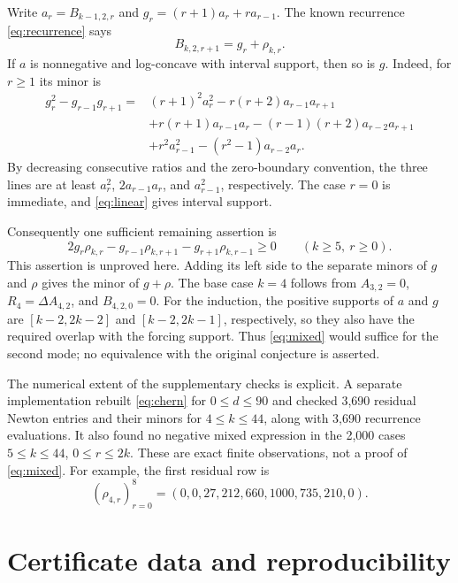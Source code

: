 \documentclass[11pt]{article}
\begin{document}
Write $a_r=B_{k-1,2,r}$ and $g_r=(r+1)a_r+r a_{r-1}$. The known
recurrence \eqref{eq:recurrence} says
\begin{equation}\label{eq:induction}
B_{k,2,r+1}=g_r+\rho_{k,r}.
\end{equation}
If $a$ is nonnegative and log-concave with interval support, then so is
$g$. Indeed, for $r\geq1$ its minor is
\begin{align*}
g_r^2-g_{r-1}g_{r+1}={}&
(r+1)^2a_r^2-r(r+2)a_{r-1}a_{r+1}\\
&+r(r+1)a_{r-1}a_r-(r-1)(r+2)a_{r-2}a_{r+1}\\
&+r^2a_{r-1}^2-(r^2-1)a_{r-2}a_r.
\end{align*}
By decreasing consecutive ratios and the zero-boundary convention,
the three lines are at least $a_r^2$, $2a_{r-1}a_r$, and
$a_{r-1}^2$, respectively. The case $r=0$ is immediate, and
\eqref{eq:linear} gives interval support.

Consequently one sufficient remaining assertion is
\begin{equation}\label{eq:mixed}
2g_r\rho_{k,r}-g_{r-1}\rho_{k,r+1}-g_{r+1}\rho_{k,r-1}\geq0
\qquad(k\geq5,\ r\geq0).
\end{equation}
This assertion is unproved here. Adding its left side to the separate
minors of $g$ and $\rho$ gives the minor of $g+\rho$. The base case
$k=4$ follows from $A_{3,2}=0$, $R_4=\Delta A_{4,2}$, and
$B_{4,2,0}=0$. For the induction, the positive supports of $a$ and $g$
are $[k-2,2k-2]$ and $[k-2,2k-1]$, respectively, so they also have the
required overlap with the forcing support. Thus \eqref{eq:mixed}
would suffice for the second mode; no equivalence with the original
conjecture is asserted.

The numerical extent of the supplementary checks is explicit. A separate
implementation rebuilt \eqref{eq:chern} for $0\leq d\leq90$ and checked
3,690 residual Newton entries and their minors for $4\leq k\leq44$,
along with 3,690 recurrence evaluations. It also found no negative
mixed expression in the 2,000 cases $5\leq k\leq44$, $0\leq r\leq2k$.
These are exact finite observations, not a proof of \eqref{eq:mixed}.
For example, the first residual row is
\[
(\rho_{4,r})_{r=0}^{8}=(0,0,27,212,660,1000,735,210,0).
\]

\appendix
\section{Certificate data and reproducibility}\label{app:certificate}
\end{document}
